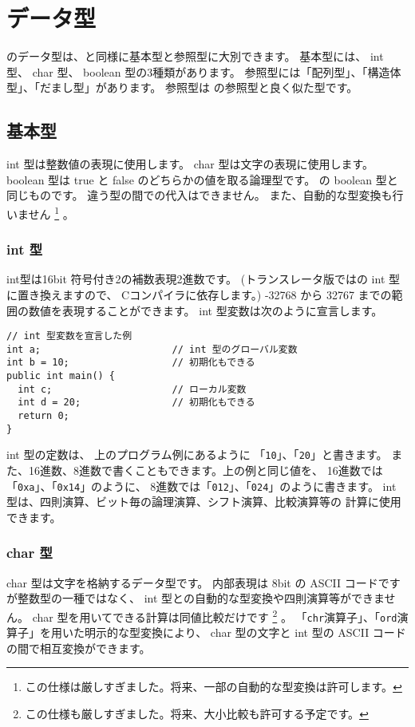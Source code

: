 \section{データ型}

\cmml のデータ型は、\javal と同様に基本型と参照型に大別できます。
基本型には、 int 型、 char 型、 boolean 型の3種類があります。
参照型には「配列型」、「構造体型」、「だまし型」があります。
参照型は \javal の参照型と良く似た型です。

\subsection{基本型}

int 型は整数値の表現に使用します。
char 型は文字の表現に使用します。
boolean 型は true と false のどちらかの値を取る論理型です。
\javal の boolean 型と同じものです。
違う型の間での代入はできません。
また、自動的な型変換も行いません
\footnote{この仕様は厳しすぎました。将来、一部の自動的な型変換は許可します。}
。

\subsubsection{int 型}
int型は16bit 符号付き2の補数表現2進数です。
(トランスレータ版では\cl の int 型に置き換えますので、
Cコンパイラに依存します。)
-32768 から 32767 までの範囲の数値を表現することができます。
int 型変数は次のように宣言します。

\begin{mylist}
\begin{verbatim}
// int 型変数を宣言した例
int a;                       // int 型のグローバル変数
int b = 10;                  // 初期化もできる
public int main() {
  int c;                     // ローカル変数
  int d = 20;                // 初期化もできる
  return 0;
}
\end{verbatim}
\end{mylist}

int 型の定数は、
上のプログラム例にあるように 「\verb/10/」、「\verb/20/」と書きます。
また、16進数、8進数で書くこともできます。上の例と同じ値を、
16進数では「\verb/0xa/」、「\verb/0x14/」のように、
8進数では「\verb/012/」、「\verb/024/」のように書きます。
int 型は、四則演算、ビット毎の論理演算、シフト演算、比較演算等の
計算に使用できます。

\subsubsection{char 型}
char 型は文字を格納するデータ型です。
内部表現は 8bit の ASCII コードですが整数型の一種ではなく、
int 型との自動的な型変換や四則演算等ができません。
char 型を用いてできる計算は同値比較だけです
\footnote{この仕様も厳しすぎました。将来、大小比較も許可する予定です。}
。
「\verb/chr/演算子」、「\verb/ord/演算子」を用いた明示的な型変換により、
char 型の文字と int 型の ASCII コードの間で相互変換ができます。


